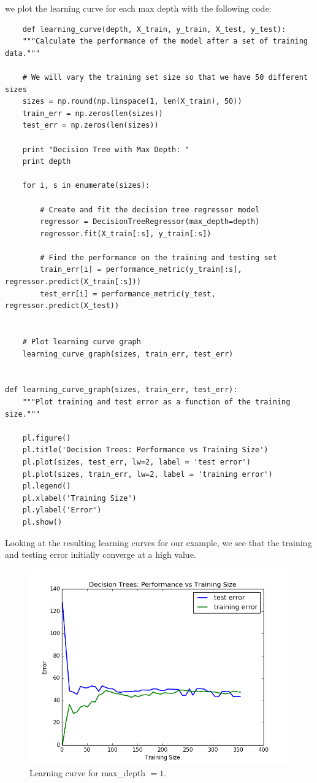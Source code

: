 \documentclass[12 pt]{article}
\numberwithin{equation}{section}
\begin{document}
we plot the learning curve for each max depth with the following code:

\begin{verbatim}
	def learning_curve(depth, X_train, y_train, X_test, y_test):
    """Calculate the performance of the model after a set of training data."""

    # We will vary the training set size so that we have 50 different sizes
    sizes = np.round(np.linspace(1, len(X_train), 50))
    train_err = np.zeros(len(sizes))
    test_err = np.zeros(len(sizes))

    print "Decision Tree with Max Depth: "
    print depth

    for i, s in enumerate(sizes):

        # Create and fit the decision tree regressor model
        regressor = DecisionTreeRegressor(max_depth=depth)
        regressor.fit(X_train[:s], y_train[:s])

        # Find the performance on the training and testing set
        train_err[i] = performance_metric(y_train[:s], regressor.predict(X_train[:s]))
        test_err[i] = performance_metric(y_test, regressor.predict(X_test))


    # Plot learning curve graph
    learning_curve_graph(sizes, train_err, test_err)


def learning_curve_graph(sizes, train_err, test_err):
    """Plot training and test error as a function of the training size."""

    pl.figure()
    pl.title('Decision Trees: Performance vs Training Size')
    pl.plot(sizes, test_err, lw=2, label = 'test error')
    pl.plot(sizes, train_err, lw=2, label = 'training error')
    pl.legend()
    pl.xlabel('Training Size')
    pl.ylabel('Error')
    pl.show()
\end{verbatim}
Looking at the resulting learning curves for our example, we see that the training and testing error initially converge at a high value. 

\begin{figure}[h]
\begin{center}
		\includegraphics[scale=0.4]{figure_1}
		\caption{Learning curve for max\_depth $= 1$.}
\end{center}
\end{figure}
\end{document}
